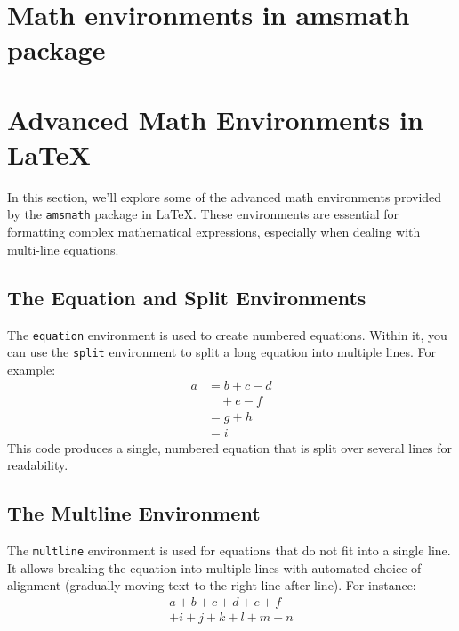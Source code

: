 \section{Math environments in amsmath package}
\section{Advanced Math Environments in LaTeX}
\par In this section, we'll explore some of the advanced math environments provided by the \verb"amsmath" package in LaTeX. These environments are essential for formatting complex mathematical expressions, especially when dealing with multi-line equations.

\subsection{The Equation and Split Environments}
\par The \verb"equation" environment is used to create numbered equations. Within it, you can use the \verb"split" environment to split a long equation into multiple lines. For example:
\begin{equation}\label{eq:one}
    \begin{split}
      a & = b+c-d\\
        & \quad +e-f\\
        & =g+h\\
        & =i
    \end{split}
\end{equation}
This code produces a single, numbered equation that is split over several lines for readability.

\subsection{The Multline Environment}
\par The \verb"multline" environment is used for equations that do not fit into a single line. It allows breaking the equation into multiple lines with automated choice of alignment (gradually moving text to the right line after line). For instance:
\begin{multline}
    a+b+c+d+e+f\\
    +i+j+k+l+m+n
\end{multline}


